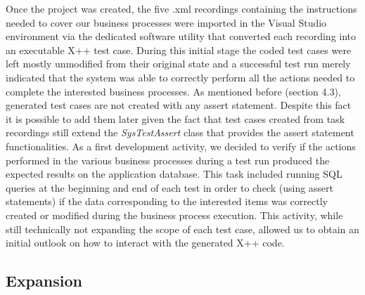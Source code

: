Once the project was created, the five .xml recordings containing the instructions needed to cover our business processes were imported in the Visual Studio environment via the dedicated software utility that converted each recording into an executable X++ test case. During this initial stage the coded test cases were left mostly unmodified from their original state and a successful test run merely indicated that the system was able to correctly perform all the actions needed to complete the interested business processes. As mentioned before (section 4.3), generated test cases are not created with any assert statement. Despite this fact it is possible to add them later given the fact that test cases created from task recordings still extend the \textit{SysTestAssert} class that provides the assert statement functionalities. As a first development activity, we decided to verify if the actions performed in the various business processes during a test run produced the expected results on the application database. This task included running SQL queries at the beginning and end of each test in order to check (using assert statements) if the data corresponding to the interested items was correctly created or modified during the business process execution. This activity, while still technically not expanding the scope of each test case, allowed us to obtain an initial outlook on how to interact with the generated X++ code.

\subsection{Expansion}

